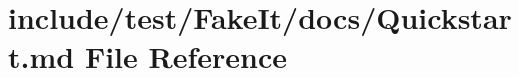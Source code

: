\hypertarget{Quickstart_8md}{}\section{include/test/\+Fake\+It/docs/\+Quickstart.md File Reference}
\label{Quickstart_8md}
